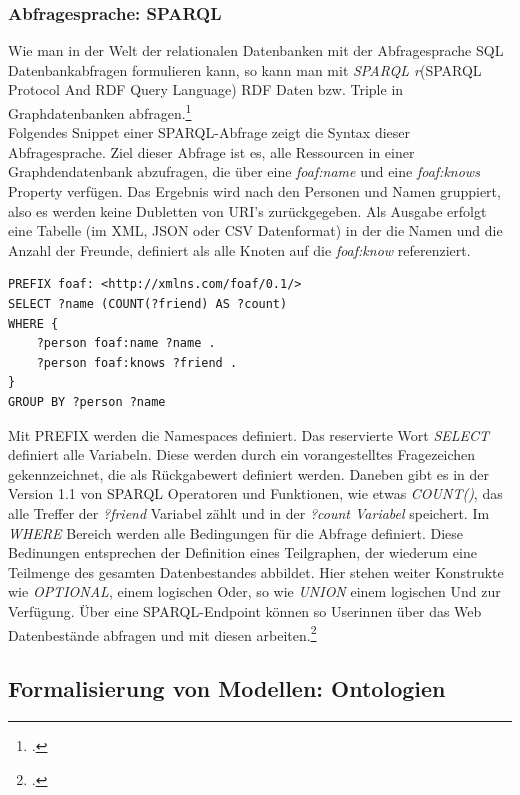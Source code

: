 \documentclass[12pt,a4paper]{article}
\begin{document}
\subsubsection{Abfragesprache: SPARQL}
Wie man in der Welt der relationalen Datenbanken mit der Abfragesprache SQL Datenbankabfragen formulieren kann, so kann man mit \textit{SPARQL r}(SPARQL Protocol And RDF Query Language) RDF Daten bzw. Triple in Graphdatenbanken abfragen.\footcite[][]{w3c2013sparql}
\\
Folgendes Snippet einer SPARQL-Abfrage zeigt die Syntax dieser Abfragesprache. Ziel dieser Abfrage ist es, alle Ressourcen in einer Graphdendatenbank abzufragen, die über eine \textit{foaf:name} und eine \textit{foaf:knows} Property verfügen. Das Ergebnis wird nach den Personen und Namen gruppiert, also es werden keine Dubletten von URI's zurückgegeben. Als Ausgabe erfolgt eine Tabelle (im XML, JSON oder CSV Datenformat) in der die Namen und die Anzahl der Freunde, definiert als alle Knoten auf die \textit{foaf:know} referenziert.
\begin{lstlisting}[]
PREFIX foaf: <http://xmlns.com/foaf/0.1/>
SELECT ?name (COUNT(?friend) AS ?count)
WHERE { 
    ?person foaf:name ?name . 
    ?person foaf:knows ?friend . 
} 
GROUP BY ?person ?name
\end{lstlisting}
Mit PREFIX werden die Namespaces definiert. Das reservierte Wort \textit{SELECT} definiert alle Variabeln. Diese werden durch ein vorangestelltes Fragezeichen gekennzeichnet, die als Rückgabewert definiert werden. Daneben gibt es in der Version 1.1 von SPARQL Operatoren und Funktionen, wie etwas \textit{COUNT()}, das alle Treffer der \textit{?friend} Variabel zählt und in der \textit{?count Variabel} speichert. Im \textit{WHERE} Bereich werden alle Bedingungen für die Abfrage definiert. Diese Bedinungen entsprechen der Definition eines Teilgraphen, der wiederum eine Teilmenge des gesamten Datenbestandes abbildet. Hier stehen weiter Konstrukte wie \textit{OPTIONAL}, einem logischen Oder, so wie \textit{UNION} einem logischen Und zur Verfügung. Über eine SPARQL-Endpoint können so Userinnen über das Web Datenbestände abfragen und mit diesen arbeiten.\footcite[][S.1-45]{ducharme2013learning}


\subsection{Formalisierung von Modellen: Ontologien}
\label{Ontologie}
\end{document}
